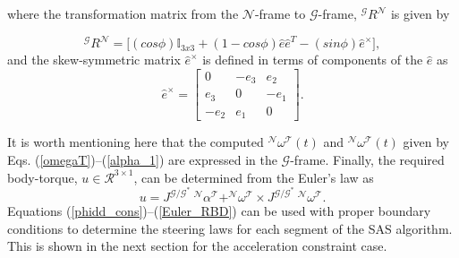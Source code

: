 \documentclass[letterpaper, paper,12pt]{AAS}		%
\begin{document}
		
where the transformation matrix from the $\mathcal{N}$-frame to $\mathcal{G}$-frame, $^\mathcal{G}R^\mathcal{N}$ is given by

\begin{equation} \label{G_R_N}
^\mathcal{G}R^\mathcal{N}= \big[(cos\phi)\mathbb{I}_{3x3} + (1 - cos\phi)\hat{e}\hat{e}^T - (sin\phi)\hat{e}^\times \big],
\end{equation}
and the skew-symmetric matrix $\hat{e}^\times$ is defined in terms of components of the $\hat{e}$ as
\begin{equation}
	\hat{e}^\times=\begin{bmatrix}
	0 & -e_3 & e_2 \\
	 e_3 & 0& -e_1 \\
	-e_2 & e_1 & 0  
	\end{bmatrix}.
\end{equation}

It is worth mentioning here that the computed $^\mathcal{N}\omega^\mathcal{T}(t)$ and $^\mathcal{N}\omega^\mathcal{T}(t)$  given by Eqs. (\ref{omegaT})--(\ref{alpha_1}) are expressed in the $\mathcal{G}$-frame. Finally, the required body-torque, $u\in\mathcal{R}^{3\times 1}$, can be determined from the Euler's law as 
\begin{equation} \label{Euler_RBD}
u=J^{\mathcal{G/G^*}}\ ^\mathcal{N}\alpha^\mathcal{T} + ^\mathcal{N}\omega^\mathcal{T} \times J^{\mathcal{G/G^*}}\ ^\mathcal{N}\omega^\mathcal{T}.
\end{equation} 
%
%
%
%
%
Equations (\ref{phidd_cons})--(\ref{Euler_RBD}) can be used with proper boundary conditions to determine the steering laws for each segment of the SAS algorithm. This is shown in the next section for the acceleration constraint case.
	
\end{document}
